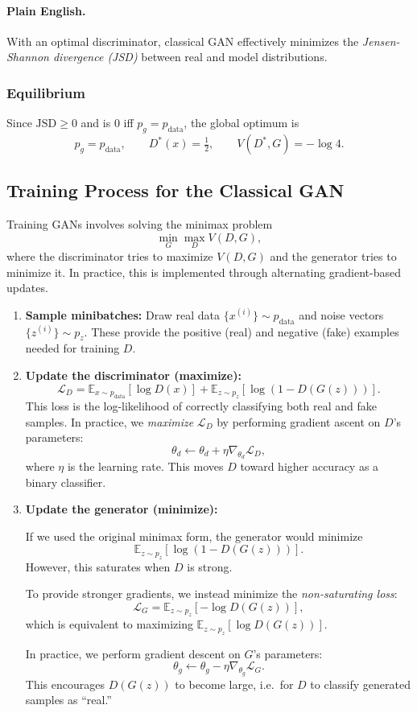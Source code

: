 \documentclass[11pt]{article}
\theoremstyle{remark}
\begin{document}
\paragraph{Plain English.}
With an optimal discriminator, classical GAN effectively minimizes the \emph{Jensen-Shannon divergence (JSD)} between real and model distributions.

\subsubsection{Equilibrium}
Since $\mathrm{JSD}\ge 0$ and is $0$ iff $p_g=p_{\text{data}}$, the global optimum is
\[
p_g=p_{\text{data}},\qquad D^*(x)=\tfrac12,\qquad V(D^*,G)=-\log 4.
\]

\subsection{Training Process for the Classical GAN}

Training GANs involves solving the minimax problem
\[
\min_G \max_D V(D,G),
\]
where the discriminator tries to maximize $V(D,G)$ and the generator tries to minimize it. In practice, this is implemented through alternating gradient-based updates.

\begin{enumerate}
\item \textbf{Sample minibatches:}
Draw real data $\{x^{(i)}\}\sim p_{\text{data}}$ and noise vectors $\{z^{(i)}\}\sim p_z$.
These provide the positive (real) and negative (fake) examples needed for training $D$.

\item \textbf{Update the discriminator (maximize):}
\[
\mathcal{L}_D=\mathbb{E}_{x\sim p_{\text{data}}}[\log D(x)] + \mathbb{E}_{z\sim p_z}[\log(1-D(G(z)))].
\]
This loss is the log-likelihood of correctly classifying both real and fake samples.
In practice, we \emph{maximize} $\mathcal{L}_D$ by performing gradient ascent on $D$'s parameters:
\[
\theta_d \leftarrow \theta_d + \eta \nabla_{\theta_d} \mathcal{L}_D,
\]
where $\eta$ is the learning rate.
This moves $D$ toward higher accuracy as a binary classifier.

\item \textbf{Update the generator (minimize):}

If we used the original minimax form, the generator would minimize
\[
\mathbb{E}_{z\sim p_z}[\log(1-D(G(z)))].
\]
However, this saturates when $D$ is strong.

To provide stronger gradients, we instead minimize the \emph{non-saturating loss}:
\[
\mathcal{L}_G = \mathbb{E}_{z\sim p_z}[-\log D(G(z))],
\]
which is equivalent to maximizing $\mathbb{E}_{z\sim p_z}[\log D(G(z))]$.

In practice, we perform gradient descent on $G$'s parameters:
\[
\theta_g \leftarrow \theta_g - \eta \nabla_{\theta_g} \mathcal{L}_G.
\]
This encourages $D(G(z))$ to become large, i.e.\ for $D$ to classify generated samples as ``real.''
\end{enumerate}
\end{document}
